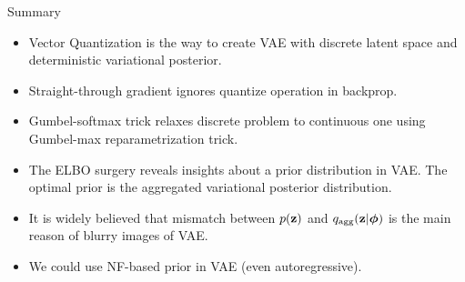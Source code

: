 \begin{frame}{Summary}
	\begin{itemize}
		\item Vector Quantization is the way to create VAE with discrete latent space and deterministic variational posterior. 
		\vfill
		\item Straight-through gradient ignores quantize operation in backprop.			
		\vfill
		\item Gumbel-softmax trick relaxes discrete problem to continuous one using Gumbel-max reparametrization trick.
		\vfill	
		\item The ELBO surgery reveals insights about a prior distribution in VAE. The optimal prior is the aggregated variational posterior distribution. 
		\vfill
		\item It is widely believed that mismatch between $p(\mathbf{z})$ and $q_{\text{agg}}(\mathbf{z} | \boldsymbol{\phi})$ is the main reason of blurry images of VAE.
		\vfill
		\item We could use NF-based prior in VAE (even autoregressive).
	\end{itemize}
\end{frame}
 